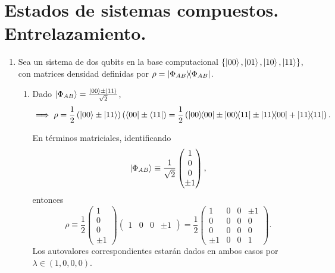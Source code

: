 \documentclass{scrartcl}
\newcommand{\inv}[1]{\frac{1}{#1}}
\DeclareRobustCommand{\[}{\begin{equation}}
\DeclareRobustCommand{\]}{\end{equation}}
\begin{document}
\section{Estados de sistemas compuestos. Entrelazamiento.}
\begin{enumerate}
    
    \item Sea un sistema de dos qubits en la base computacional $\{ \ket{00}, \ket{01}, \ket{10}, \ket{11} \}$, con matrices densidad definidas por $\rho = \dyad{\Phi_{AB}}{\Phi_{AB}}$.
    \begin{enumerate}
        \item Dado $\ket{\Phi_{AB}} = \frac{\ket{00} \pm \ket{11}}{\sqrt{2}}$,
        \[ \implies \rho = \inv{2} \left( \ket{00} \pm \ket{11} \right) \left(\bra{00} \pm \bra{11} \right) = \inv{2} \left( \dyad{00}{00} \pm \dyad{00}{11} \pm \dyad{11}{00} + \dyad{11}{11} \right). \]
        
        En términos matriciales, identificando
        \[
            \ket{\Phi_{AB}} \equiv \inv{\sqrt{2}}
            \begin{pmatrix}
                1 \\ 0 \\ 0 \\ \pm 1
            \end{pmatrix},
        \]
        entonces
        \[
            \rho \equiv \inv{2}
            \begin{pmatrix}
                1 \\ 0 \\ 0 \\ \pm 1
            \end{pmatrix}
            \begin{pmatrix}
                1 & 0 & 0 & \pm 1
            \end{pmatrix}
            =
            \inv{2}
            \begin{pmatrix}
                1 & 0 & 0 & \pm 1 \\
                0 & 0 & 0 & 0 \\
                0 & 0 & 0 & 0 \\
                \pm 1 & 0 & 0 & 1
            \end{pmatrix}.
        \]
        Los autovalores correspondientes estarán dados en ambos casos por $\lambda \in (1, 0, 0, 0)$.
        

\end{enumerate}
\end{enumerate}
\end{document}
